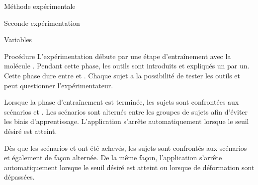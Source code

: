\documentclass[myfrancais,ngerman,english,frenchb]{mythesis}
\begin{document}
\begin{mychapter}{Méthode expérimentale}
\begin{mysection}{Seconde expérimentation}
\begin{mysubsection}{Variables}
			\end{mysubsection}
			\begin{mysubsection}{Procédure}
				L'expérimentation débute par une étape d'entraînement avec la molécule \myPrion.
				Pendant cette phase, les outils sont introduits et expliqués un par un.
				Cette phase dure entre  et .
				Chaque sujet a la possibilité de tester les outils et peut questionner l'expérimentateur.

				Lorsque la phase d'entraînement est terminée, les sujets sont confrontées aux scénarios  et .
				Les scénarios sont alternés entre les groupes de sujets afin d'éviter les biais d'apprentissage.
				L'application s'arrête automatiquement lorsque le seuil  désiré est atteint.

				Dès que les scénarios  et  ont été achevés, les sujets sont confrontés aux scénarios  et  également de façon alternée.
				De la même façon, l'application s'arrête automatiquement lorsque le seuil  désiré est atteint ou lorsque  de déformation sont dépassées.


\end{mysubsection}
\end{mysection}
\end{mychapter}
\end{document}
